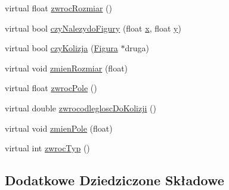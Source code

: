 \begin{DoxyCompactItemize}
\item 
virtual float \hyperlink{classTrojkat_a7a8add838eb57536c3d7d4afa6cf6e9d}{zwroc\-Rozmiar} ()
\item 
virtual bool \hyperlink{classTrojkat_a702583c2fc42a5e250f59de61925be03}{czy\-Nalezydo\-Figury} (float \hyperlink{classFigura_ad640a05ebb1ddbf595124f0b31793e8a}{x}, float \hyperlink{classFigura_ab17e5953f2898eb729b2dc506640bce2}{y})
\item 
virtual bool \hyperlink{classTrojkat_af7a0a4a4ffdc5b832f8c0c933261567e}{czy\-Kolizja} (\hyperlink{classFigura}{Figura} $\ast$druga)
\item 
virtual void \hyperlink{classTrojkat_a8e50af24f4947c6c3b61f4812b0d1ddd}{zmien\-Rozmiar} (float)
\item 
virtual float \hyperlink{classTrojkat_a8437ba74adf44d8724293dfdda0f5c7f}{zwroc\-Pole} ()
\item 
virtual double \hyperlink{classTrojkat_a4ad8638c5afb819d8ab33b9a6b681497}{zwrocodleglosc\-Do\-Kolizji} ()
\item 
virtual void \hyperlink{classTrojkat_a7eeb5a5c810989f3b2790f058c0e3b19}{zmien\-Pole} (float)
\item 
virtual int \hyperlink{classTrojkat_ad00f4b47a0ffc60b9505a3c239e56530}{zwroc\-Typ} ()
\end{DoxyCompactItemize}
\subsection*{Dodatkowe Dziedziczone Składowe}


